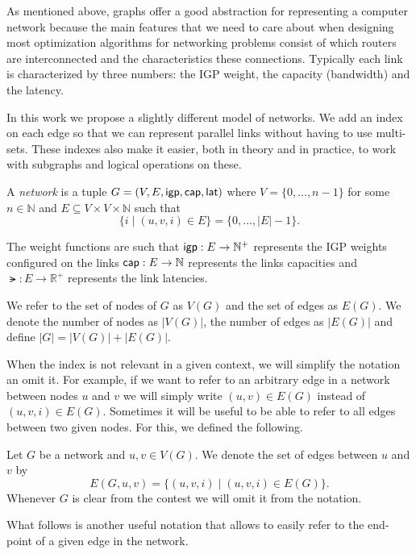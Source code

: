 As mentioned above, graphs offer a good abstraction for representing a computer network because the main features that
we need to care about when designing most optimization algorithms for networking problems
consist of which routers are interconnected and the characteristics these connections. Typically each
link is characterized by three numbers: the IGP weight, the capacity (bandwidth) and the latency.

In this work we propose a slightly different model of networks. We add an index on each edge so that
we can represent parallel links without having to use multi-sets. These indexes also make it easier, both in
theory and in practice, to work with subgraphs and logical operations on these.

\begin{definition}
A \emph{network} is a tuple $G = (V, E, \mathsf{igp}, \mathsf{cap}, \mathsf{lat})$ where
$V = \{0, \ldots, n - 1\}$ for some $n \in \mathbb{N}$ and
$E \subseteq V \times V \times \mathbb{N}$ such that 
$$
\{ i \mid (u, v, i) \in E \} = \{ 0, \ldots, |E| - 1 \}.
$$

The weight functions are such that $\mathsf{igp} : E \rightarrow \mathbb{N}^+$
represents the IGP weights configured on the links $\mathsf{cap} : E \rightarrow \mathbb{N}$ represents the links
capacities and $\lat : E \rightarrow \mathbb{R}^+$ represents the link latencies.

We refer to the set of nodes of $G$ as $V(G)$ and the set of edges as $E(G)$. We denote the number of nodes
as $|V(G)|$, the number of edges as $|E(G)|$ and define $|G| = |V(G)| + |E(G)|$.
\end{definition}

When the index is not relevant in a given context, we will simplify the notation an omit it.
For example, if we want to refer to an arbitrary edge in a network between nodes $u$ and $v$ 
we will simply write $(u, v) \in E(G)$ instead of $(u, v, i) \in E(G)$.
Sometimes it will be useful to be able to refer to all edges between two given nodes. For this,
we defined the following.

\begin{definition}
Let $G$ be a network and $u, v \in V(G)$. We denote the set of edges between $u$ and $v$ by
$$
E(G, u, v) = \{ (u, v, i) \mid  (u, v, i) \in E(G) \}.
$$
Whenever $G$ is clear from the contest we will omit it from the notation.
\end{definition}

What follows is another useful notation that allows to easily refer to the end-point of a given 
edge in the network.

